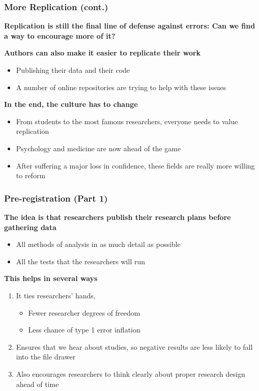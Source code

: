 \documentclass[10pt, block=fill]{beamer}
\begin{document}
 
 \begin{frame}
     \frametitle{More Replication (cont.)}
     
    {\large \textbf{Replication is still the final line of defense against errors: Can we find a way to encourage more of it?} }
    
    \vspace{0.1in}
         
    \textbf{Authors can also make it easier to replicate their work}
    \begin{itemize}
        \item Publishing their data and their code
        \item A number of online repositories are trying to help with these issues
    \end{itemize}
    
    \vspace{0.1in}
        
    \textbf{In the end, the culture has to change}
    \begin{itemize}
        \item From students to the most famous researchers, everyone needs to value replication
        \item Psychology and medicine are now ahead of the game
        \item After suffering a major loss in confidence, these fields are really more willing to reform
    \end{itemize}

\end{frame}


\begin{frame}
    \frametitle{Pre-registration (Part 1)}
    
    \textbf{The idea is that researchers publish their research plans before gathering data}
    \begin{itemize}
        \item All methods of analysis in as much detail as possible
        \item All the tests that the researchers will run
    \end{itemize}
    
    \vspace{0.25in}
    
    \textbf{This helps in several ways}
    \begin{enumerate}
        \item It ties researchers' hands, 
        \begin{itemize}
            \item Fewer researcher degrees of freedom
            \item Less chance of type 1 error inflation
        \end{itemize} 
        \item Ensures that we hear about studies, so negative results are less likely to fall into the file drawer
        \item Also encourages researchers to think clearly about proper research design ahead of time
    \end{enumerate}
\end{frame}
\end{document}
